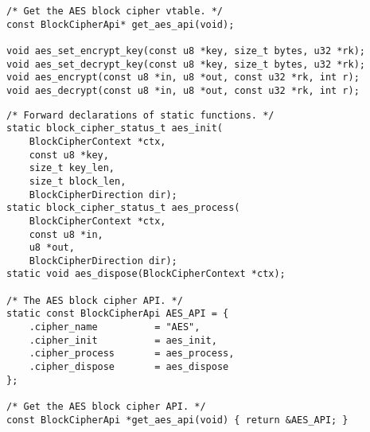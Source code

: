 %	
%	


\begin{lstlisting}[style=cstyle, caption={include/block\_cipher/block\_cipher\_aes.h}, captionpos=t]
/* Get the AES block cipher vtable. */
const BlockCipherApi* get_aes_api(void);

void aes_set_encrypt_key(const u8 *key, size_t bytes, u32 *rk);
void aes_set_decrypt_key(const u8 *key, size_t bytes, u32 *rk);
void aes_encrypt(const u8 *in, u8 *out, const u32 *rk, int r);
void aes_decrypt(const u8 *in, u8 *out, const u32 *rk, int r);
\end{lstlisting}
\begin{lstlisting}[style=cstyle, caption={src/block\_cipher/block\_cipher\_aes.c}, captionpos=t]
/* Forward declarations of static functions. */
static block_cipher_status_t aes_init(
	BlockCipherContext *ctx, 
	const u8 *key, 
	size_t key_len, 
	size_t block_len, 
	BlockCipherDirection dir);
static block_cipher_status_t aes_process(
	BlockCipherContext *ctx, 
	const u8 *in,
	u8 *out, 
	BlockCipherDirection dir);
static void aes_dispose(BlockCipherContext *ctx);

/* The AES block cipher API. */
static const BlockCipherApi AES_API = {
	.cipher_name          = "AES",
	.cipher_init          = aes_init,
	.cipher_process       = aes_process,
	.cipher_dispose       = aes_dispose
};

/* Get the AES block cipher API. */
const BlockCipherApi *get_aes_api(void) { return &AES_API; }
\end{lstlisting}
\newpage

